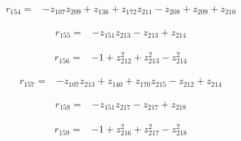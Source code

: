 \par\noindent\begin{minipage}{\linewidth}
\begin{align*}
r_{154}={}&-z_{107}z_{209}+z_{136}+z_{172}z_{211}-z_{208}+z_{209}+z_{210}
\end{align*}
\end{minipage}\par
\par\noindent\begin{minipage}{\linewidth}
\begin{align*}
r_{155}={}&-z_{151}z_{213}-z_{213}+z_{214}
\end{align*}
\end{minipage}\par
\par\noindent\begin{minipage}{\linewidth}
\begin{align*}
r_{156}={}&-1+z_{212}^{2}+z_{213}^{2}-z_{214}^{2}
\end{align*}
\end{minipage}\par
\par\noindent\begin{minipage}{\linewidth}
\begin{align*}
r_{157}={}&-z_{107}z_{213}+z_{140}+z_{170}z_{215}-z_{212}+z_{214}
\end{align*}
\end{minipage}\par
\par\noindent\begin{minipage}{\linewidth}
\begin{align*}
r_{158}={}&-z_{151}z_{217}-z_{217}+z_{218}
\end{align*}
\end{minipage}\par
\par\noindent\begin{minipage}{\linewidth}
\begin{align*}
r_{159}={}&-1+z_{216}^{2}+z_{217}^{2}-z_{218}^{2}
\end{align*}
\end{minipage}\par
